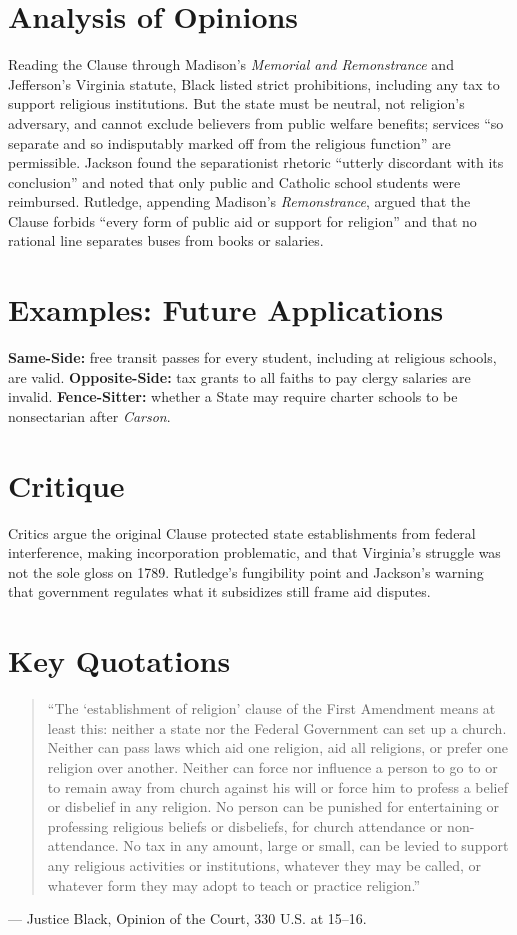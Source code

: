 \documentclass[12pt]{article}
\begin{document}
\section{Analysis of Opinions}
Reading the Clause through Madison's \emph{Memorial and Remonstrance} and Jefferson's Virginia statute, Black listed strict prohibitions, including any tax to support religious institutions. But the state must be neutral, not religion's adversary, and cannot exclude believers from public welfare benefits; services ``so separate and so indisputably marked off from the religious function'' are permissible. Jackson found the separationist rhetoric ``utterly discordant with its conclusion'' and noted that only public and Catholic school students were reimbursed. Rutledge, appending Madison's \emph{Remonstrance}, argued that the Clause forbids ``every form of public aid or support for religion'' and that no rational line separates buses from books or salaries.

\section{Examples: Future Applications}
\textbf{Same-Side:} free transit passes for every student, including at religious schools, are valid. \textbf{Opposite-Side:} tax grants to all faiths to pay clergy salaries are invalid. \textbf{Fence-Sitter:} whether a State may require charter schools to be nonsectarian after \textit{Carson}.

\section{Critique}
Critics argue the original Clause protected state establishments from federal interference, making incorporation problematic, and that Virginia's struggle was not the sole gloss on 1789. Rutledge's fungibility point and Jackson's warning that government regulates what it subsidizes still frame aid disputes.

\section{Key Quotations}
\begin{quote}
``The `establishment of religion' clause of the First Amendment means at least this: neither a state nor the Federal Government can set up a church. Neither can pass laws which aid one religion, aid all religions, or prefer one religion over another. Neither can force nor influence a person to go to or to remain away from church against his will or force him to profess a belief or disbelief in any religion. No person can be punished for entertaining or professing religious beliefs or disbeliefs, for church attendance or non-attendance. No tax in any amount, large or small, can be levied to support any religious activities or institutions, whatever they may be called, or whatever form they may adopt to teach or practice religion.''
\end{quote}
\noindent --- Justice Black, Opinion of the Court, 330 U.S. at 15--16.
\end{document}
